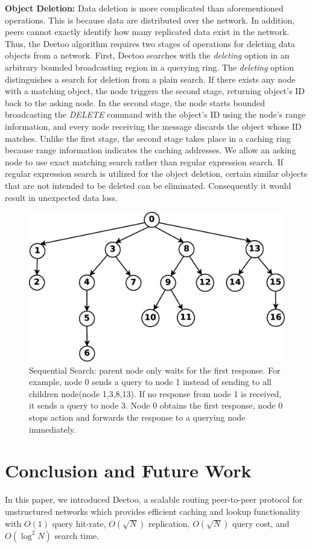 \textbf{Object Deletion:} Data deletion is more complicated than aforementioned operations.
This is because data are distributed over the network. In addition, peers cannot exactly identify 
how many replicated data exist in the network.
Thus, the Deetoo algorithm requires two stages of operations for deleting data objects from a network. 
First, Deetoo searches with the \textit{deleting} option 
in an arbitrary bounded broadcasting region in a querying ring. The \textit{deleting} 
option distinguishes a search for deletion from a plain search.
If there exists any node with a matching object, the node triggers the second stage, returning 
object's ID back to the asking node. 
In the second stage, the node starts bounded broadcasting the \textit{DELETE} command with the object's ID using 
the node's range information, and every node receiving the message discards the object whose ID matches.
Unlike the first stage, the second stage takes place in a caching ring because range 
information indicates the caching addresses.
We allow an asking node to use exact matching search rather than regular expression search. 
If regular expression search is utilized for the object deletion, 
certain similar objects that are not intended to be deleted can be eliminated. 
Consequently it would result in unexpected data loss.

\begin{figure}
\centering
\includegraphics[width=3 in]{regextree}
\caption{Sequential Search: parent node only waits for the first response. For example, 
node 0 sends a query to node 1 instead of sending to all children node(node 1,3,8,13). 
If no response from node 1 is received, it sends a query to node 3. Node 0 obtains the first 
response, node 0 stops action and forwards the response to a querying node immediately.} 
\label{fig:regextree}
\end{figure}

\section{Conclusion and Future Work}
\label{sec:conclusion}
In this paper, we introduced Deetoo, a scalable routing peer-to-peer
protocol for unstructured networks which provides efficient caching
and lookup functionality with $O(1)$ query hit-rate, $O(\sqrt N)$
replication, $O(\sqrt{N})$ query cost, and $O(\log^2 N)$ search time.

